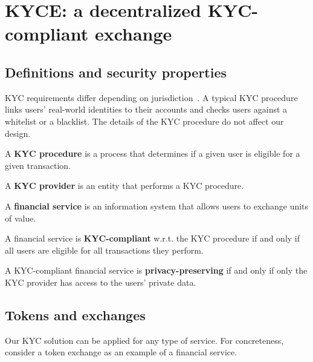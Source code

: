 
\section{KYCE: a decentralized KYC-compliant exchange}

\subsection{Definitions and security properties}

KYC requirements differ depending on jurisdiction~\cite{PWC2015}.
A typical KYC procedure links users' real-world identities to their accounts and checks users against a whitelist or a blacklist.
The details of the KYC procedure do not affect our design.

\begin{definition}
	A \textbf{KYC procedure} is a process that determines if a given user is eligible for a given transaction.
\end{definition}

\begin{definition}
	A \textbf{KYC provider} is an entity that performs a KYC procedure.
\end{definition}

\begin{definition}
	A \textbf{financial service} is an information system that allows users to exchange units of value.
\end{definition}

\begin{definition}
	A financial service is \textbf{KYC-compliant} w.r.t. the KYC procedure if and only if all users are eligible for all transactions they perform.
\end{definition}

\begin{definition}
	A KYC-compliant financial service is \textbf{privacy-preserving} if and only if only the KYC provider has access to the users' private data.
\end{definition}


\subsection{Tokens and exchanges}

Our KYC solution can be applied for any type of service.
For concreteness, consider a token exchange as an example of a financial service.

